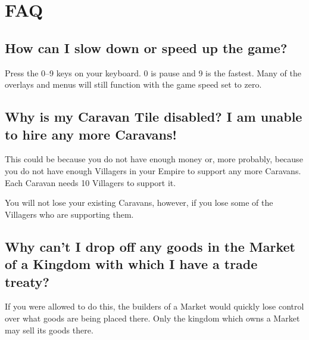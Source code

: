 
\chapter{FAQ}

\section{How can I slow down or speed up the game?}

Press the 0--9 keys on your keyboard. 0 is pause and 9 is the fastest. Many of the overlays and menus will still function with the game speed set to zero.

\section{Why is my Caravan Tile disabled? I am unable to hire any more Caravans!}

This could be because you do not have enough money or, more probably, because you do not have enough Villagers in your Empire to support any more Caravans. Each Caravan needs 10 Villagers to support it.

You will not lose your existing Caravans, however, if you lose some of the Villagers who are supporting them.

\section{Why can’t I drop off any goods in the Market of a Kingdom with which I have a trade treaty?}

If you were allowed to do this, the builders of a Market would quickly lose control over what goods are being placed there. Only the kingdom which owns a Market may sell its goods there.

